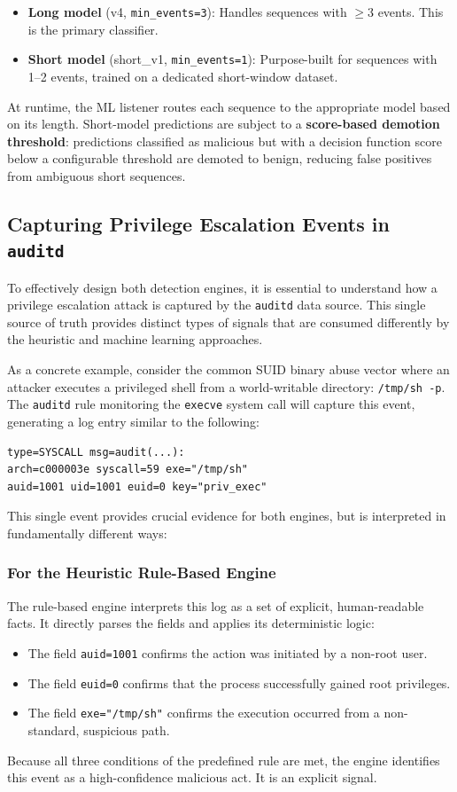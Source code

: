 \documentclass[journal]{./IEEEtran}
\begin{document}
\begin{itemize}
    \item \textbf{Long model} (v4, \texttt{min\_events=3}): Handles sequences with $\geq$3 events. This is the primary classifier.
    \item \textbf{Short model} (short\_v1, \texttt{min\_events=1}): Purpose-built for sequences with 1--2 events, trained on a dedicated short-window dataset.
\end{itemize}

At runtime, the ML listener routes each sequence to the appropriate model based on its length. Short-model predictions are subject to a \textbf{score-based demotion threshold}: predictions classified as malicious but with a decision function score below a configurable threshold are demoted to benign, reducing false positives from ambiguous short sequences.

\subsection{Capturing Privilege Escalation Events in \texttt{auditd}}
To effectively design both detection engines, it is essential to understand how a privilege escalation attack is captured by the \texttt{auditd} data source. This single source of truth provides distinct types of signals that are consumed differently by the heuristic and machine learning approaches.

As a concrete example, consider the common SUID binary abuse vector where an attacker executes a privileged shell from a world-writable directory: \texttt{/tmp/sh -p}. The \texttt{auditd} rule monitoring the \texttt{execve} system call will capture this event, generating a log entry similar to the following:

\begin{verbatim}
type=SYSCALL msg=audit(...): 
arch=c000003e syscall=59 exe="/tmp/sh" 
auid=1001 uid=1001 euid=0 key="priv_exec"
\end{verbatim}

This single event provides crucial evidence for both engines, but is interpreted in fundamentally different ways:

\subsubsection*{For the Heuristic Rule-Based Engine}
The rule-based engine interprets this log as a set of explicit, human-readable facts. It directly parses the fields and applies its deterministic logic:
\begin{itemize}
    \item The field \texttt{auid=1001} confirms the action was initiated by a non-root user.
    \item The field \texttt{euid=0} confirms that the process successfully gained root privileges.
    \item The field \texttt{exe="/tmp/sh"} confirms the execution occurred from a non-standard, suspicious path.
\end{itemize}
Because all three conditions of the predefined rule are met, the engine identifies this event as a high-confidence malicious act. It is an explicit signal.
\end{document}
